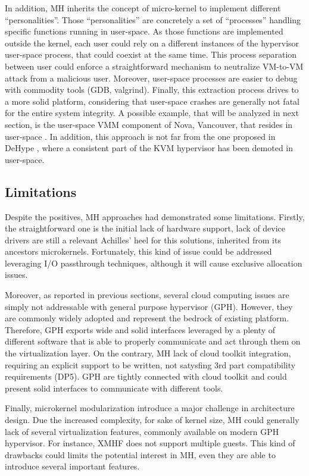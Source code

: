 \documentclass{sig-alternate}
\begin{document}
In addition, MH inherits the concept of micro-kernel to implement different ``personalities''. Those ``personalities'' are concretely a set of ``processes'' handling specific functions running in user-space. As those functions are implemented outside the kernel, each user could rely on a different instances of the hypervisor user-space process, that could coexist at the same time. This process separation between user could enforce a straightforward mechanism to neutralize VM-to-VM attack from a malicious user. Moreover, user-space processes are easier to debug with commodity tools (GDB, valgrind).
Finally, this extraction process drives to a more solid platform, considering that user-space crashes are generally not fatal for the entire system integrity.  A possible example, that will be analyzed in next section, is the user-space VMM component of Nova, Vancouver, that resides in user-space \cite{nova}.
In addition, this approach is not far from the one proposed in DeHype \cite{wu2013TamHosHypMosDepExe}, where a consistent part of the KVM hypervisor has been demoted in user-space.

\subsection {Limitations}

Despite the positives, MH approaches had demonstrated some limitations. Firstly, the straightforward one is the initial lack of hardware support, lack of device drivers are still a relevant Achilles' heel for this solutions, inherited from its ancestors microkernels. Fortunately, this kind of issue could be addressed leveraging I/O passthrough techniques, although it will cause exclusive allocation issues.

Moreover, as reported in previous sections, several cloud computing issues are simply not addressable with general purpose hypervisor (GPH). However, they are commonly widely adopted and represent the bedrock of existing platform. Therefore, GPH exports wide and solid interfaces leveraged by a plenty of different software that is able to properly communicate and act through them on the virtualization layer. On the contrary, MH lack of cloud toolkit integration, requiring an explicit support to be written, not satysfing 3rd part compatibility requirements (DP5). GPH are tightly connected with cloud toolkit and could present solid interfaces to communicate with different tools. 

Finally, microkernel modularization introduce a major challenge in architecture design. Due the increased complexity, for sake of kernel size, MH could generally lack of several virtualization features, commonly available on modern GPH hypervisor. For instance, XMHF does not support multiple guests. This kind of drawbacks could limits the potential interest in MH, even they are able to introduce several important features.
\end{document}
